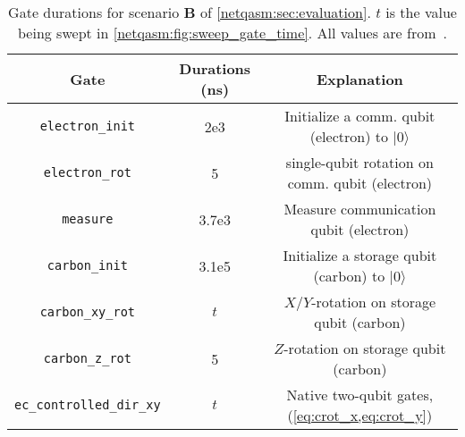 \begin{table}
  \centering
  \begin{tabular}{|c|c|c|}
    \hline
    Gate                      & Durations (ns) & Explanation                                                \\
    \hline\hline
    \texttt{electron\_init}        & 2e3            & Initialize a comm. qubit (electron) to $|0\rangle$ \\
    \texttt{electron\_rot}         & 5              & single-qubit rotation on comm. qubit (electron)    \\
    \texttt{measure}              & 3.7e3          & Measure communication qubit (electron)                     \\
    \texttt{carbon\_init}          & 3.1e5          & Initialize a storage qubit (carbon) to $|0\rangle$         \\
    \texttt{carbon\_xy\_rot}        & $t$            & $X$/$Y$-rotation on storage qubit (carbon)                 \\
    \texttt{carbon\_z\_rot}         & 5              & $Z$-rotation on storage qubit (carbon)                     \\
    \texttt{ec\_controlled\_dir\_xy} & $t$            & Native two-qubit gates, (\cref{eq:crot_x,eq:crot_y})     \\
    \hline
  \end{tabular}
  \caption{
    Gate durations for scenario \textbf{B} of \cref{netqasm:sec:evaluation}.
    $t$ is the value being swept in \cref{netqasm:fig:sweep_gate_time}.
    All values are from~\cite{dahlberg2019linklayer}.}
  \label{tab:gates}
\end{table}

